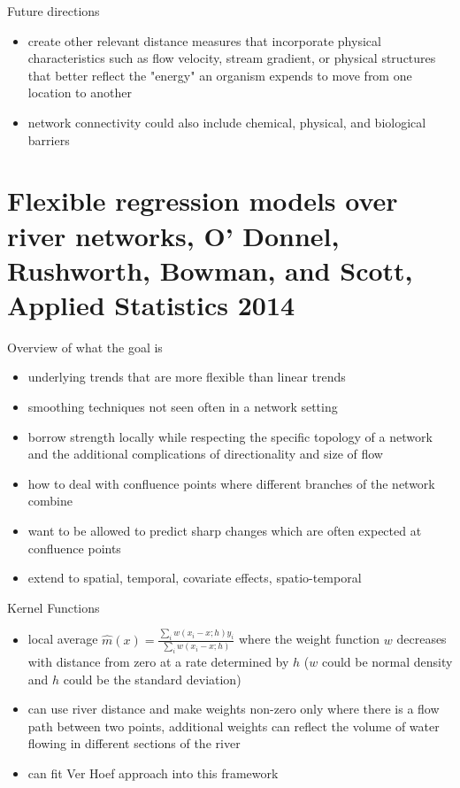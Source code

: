 \documentclass[12pt]{amsart}
\begin{document}
Future directions
\begin{itemize}
\item create other relevant distance measures that incorporate physical characteristics such as flow velocity, stream gradient, or physical structures that better reflect the "energy" an organism expends to move from one location to another
\item network connectivity could also include chemical, physical, and biological barriers
\end{itemize}

\section{Flexible regression models over river networks, O' Donnel, Rushworth, Bowman, and Scott, Applied Statistics 2014}

Overview of what the goal is
\begin{itemize}
\item underlying trends that are more flexible than linear trends
\item smoothing techniques not seen often in a network setting
\item borrow strength locally while respecting the specific topology of a network and the additional complications of directionality and size of flow
\item how to deal with confluence points where different branches of the network combine
\item want to be allowed to predict sharp changes which are often expected at confluence points
\item extend to spatial, temporal, covariate effects, spatio-temporal
\end{itemize}

Kernel Functions
\begin{itemize}
\item local average $\hat{m}(x)=\frac{\sum_i w(x_i-x; h) y_i}{\sum_i w(x_i-x;h)}$
where the weight function $w$ decreases with distance from zero at a rate determined by $h$ ($w$ could be normal density and $h$ could be the standard deviation)
\item can use river distance and make weights non-zero only where there is a flow path between two points, additional weights can reflect the volume of water flowing in different sections of the river
\item can fit Ver Hoef approach into this framework
\end{itemize}
\end{document}
